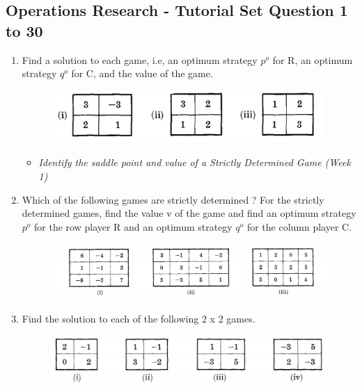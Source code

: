 \documentclass[]{report}
\begin{document}


\subsection*{Operations Research - Tutorial Set Question 1 to 30}

\begin{enumerate}
	\item 
	Find a solution to each game, i.e, an optimum strategy $p^o$ for R, an optimum strategy $q^o$ for C, and the value of the game. 
\begin{figure}[h!]
\centering
\includegraphics[width=0.55\linewidth]{TutQ1}
\label{fig:tutq1}
\end{figure}
\begin{itemize}
\item \textit{Identify the saddle point and value of a Strictly Determined Game (Week 1)}


\end{itemize}
	\item 
	Which of the following games are strictly determined ? For the strictly determined games, find the value v of the game and find an optimum strategy $p^o$  for the row player R and an optimum strategy $q^o$  for the column player C. 
	
\begin{figure}[h!]
	\centering
	\includegraphics[width=0.8\linewidth]{TutQ2}
	\label{fig:tutq2}
\end{figure}
	
	\item 

	Find the solution to each of the following 2 x 2 games. 
\begin{figure}[h!]
	\centering
	\includegraphics[width=0.65\linewidth]{TutQ3}
	\label{fig:tutq3}
\end{figure}


\end{enumerate}
\end{document}
